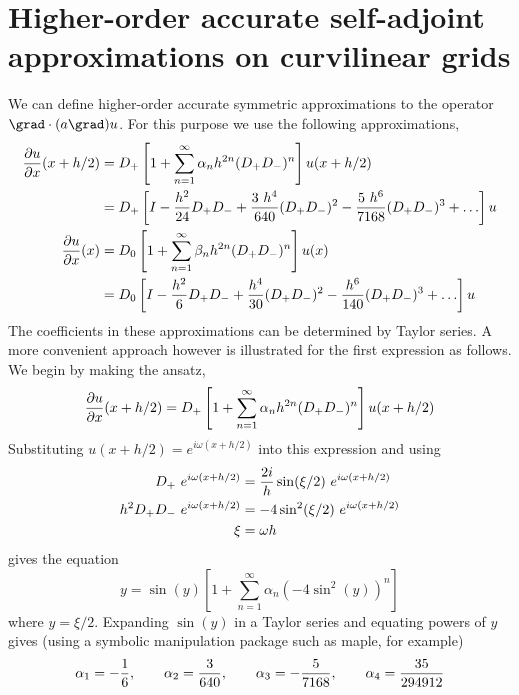 \documentclass[10pt]{article}
\begin{document}



\clearpage


\clearpage

\clearpage


\clearpage
\section{Higher-order accurate self-adjoint approximations on curvilinear grids}


We can define higher-order accurate symmetric approximations to the operator $\grad\cdot( a \grad)u$.
For this purpose we use the following approximations,
\begin{align*}
 {\partial u \over \partial x}(x+h/2) 
                        &= D_+\left[ 1 + \sum_{n=1}^{\infty}  \alpha_n h^{2n} (D_+D_-)^n \right] u(x+h/2) \\
                        &= D_+\left[ I - {h^2\over 24}D_+D_- + {3~h^4\over 640}(D_+D_-)^2 
                                                 - {5~h^6\over 7168}(D_+D_-)^3 +\ldots \right] u \\
 {\partial u \over \partial x}(x) 
                         &= D_0\left[ 1 + \sum_{n=1}^{\infty}  \beta_n h^{2n} (D_+D_-)^n \right] u(x) \\
                         &= D_0\left[ I - {h^2\over 6}D_+D_- + {h^4\over 30}(D_+D_-)^2 
                                                 - {h^6\over 140}(D_+D_-)^3 +\ldots \right] u \\ 
\end{align*}
The coefficients in these approximations can be determined by Taylor series. A more convenient approach however is
illustrated for the first expression as follows. We begin by making the ansatz,
\[
  {\partial u \over \partial x}(x+h/2) = D_+\left[ 1 + \sum_{n=1}^{\infty}  \alpha_n h^{2n} (D_+D_-)^n \right] u(x+h/2)
\]
Substituting $u(x+h/2)=e^{i\omega (x+h/2)}$ into this expression and using
\begin{align*}
  D_+ ~e^{i\omega (x+h/2)} &= {2 i\over h}  \sin(\xi/2)~e^{i\omega (x+h/2)} \\
  h^2 D_+D_- ~e^{i\omega (x+h/2)} &= - 4  \sin^2(\xi/2)~e^{i\omega (x+h/2)} \\
  \xi &= \omega h
\end{align*}
gives the equation
\[
    y = \sin(y) \left[ 1 + \sum_{n=1}^{\infty} \alpha_n (- 4 \sin^2(y))^n \right]
\]
where $y=\xi/2$. Expanding $\sin(y)$ in a Taylor series and
equating powers of $y$ gives (using a symbolic manipulation package such as maple, for example)
\[
  \alpha_1 = -{1\over6}, \qquad \alpha_2= {3\over 640} , \qquad \alpha_3= -{5\over 7168}, \qquad \alpha_4={35\over 294912}
\]
\end{document}
